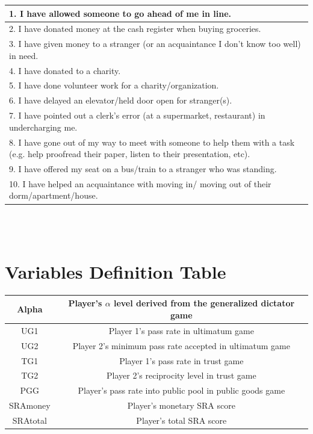 \documentclass[12pt]{article}
\begin{document}
{\begin{tabular}{ | p{12cm} | }
\hline
1. I have allowed someone to go ahead of me in line.\\
\hline
2. I have donated money at the cash register when buying groceries.\\
\hline
3. I have given money to a stranger (or an acquaintance I don\rq t know too well) in need.\\ 
\hline
4. I have donated to a charity.\\
\hline
5. I have done volunteer work for a charity/organization.\\
\hline
6. I have delayed an elevator/held door open for stranger(s).\\
\hline
7.  I have pointed out a clerk\rq s error (at a supermarket, restaurant) in undercharging me.\\
\hline
8. I have gone out of my way to meet with someone to help them with a task (e.g. help proofread their paper, listen to their presentation, etc). \\
\hline
9. I have offered my seat on a bus/train to a stranger who was standing.\\
\hline
10. I have helped an acquaintance with moving in/ moving out of their dorm/apartment/house.\\
\hline
\end{tabular} \\ \\ 

\section{Variables Definition Table} \label{app:c}

\begin{center}
\begin{tabular}{ |c|c| } 
 \hline
 Alpha & Player\rq s \(\alpha\) level derived from the generalized dictator game \\ 
 \hline
 UG1 & Player 1\rq s pass rate in ultimatum game \\ 
 \hline
 UG2 & Player 2\rq s minimum pass rate accepted in ultimatum game  \\ 
 \hline
 TG1 & Player 1\rq s pass rate in trust game \\ 
 \hline
 TG2 & Player 2\rq s reciprocity level in trust game \\ 
 \hline
 PGG & Player\rq s pass rate into public pool in public goods game  \\ 
 \hline
 SRAmoney & Player\rq s monetary SRA score \\ 
 \hline
 SRAtotal & Player\rq s total SRA score \\ 
\hline
\end{tabular}
\end{center}

}
\end{document}
